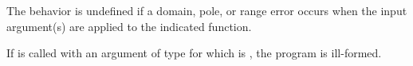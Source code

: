 \pnum\label{cl:precond-violation}%
  The behavior is undefined if a domain, pole, or range error occurs when the input argument(s) are applied to the indicated  function.



\pnum If  is called with an argument of type \simd[<X, Abi>] for which  is \true, the program is ill-formed.


